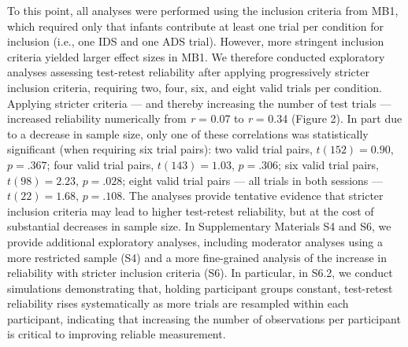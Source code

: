 \documentclass[
  man,floatsintext]{apa6}
\begin{document}
To this point, all analyses were performed using the inclusion criteria from MB1, which required only that infants contribute at least one trial per condition for inclusion (i.e., one IDS and one ADS trial).
However, more stringent inclusion criteria yielded larger effect sizes in MB1.
We therefore conducted exploratory analyses assessing test-retest reliability after applying progressively stricter inclusion criteria, requiring two, four, six, and eight valid trials per condition.
Applying stricter criteria --- and thereby increasing the number of test trials --- increased reliability numerically from \emph{r} = 0.07 to \emph{r} = 0.34 (Figure 2).
In part due to a decrease in sample size, only one of these correlations was statistically significant (when requiring six trial pairs): two valid trial pairs, \(t(152) = 0.90\), \(p = .367\); four valid trial pairs, \(t(143) = 1.03\), \(p = .306\); six valid trial pairs, \(t(98) = 2.23\), \(p = .028\); eight valid trial pairs --- all trials in both sessions --- \(t(22) = 1.68\), \(p = .108\).
The analyses provide tentative evidence that stricter inclusion criteria may lead to higher test-retest reliability, but at the cost of substantial decreases in sample size.
In Supplementary Materials S4 and S6, we provide additional exploratory analyses, including moderator analyses using a more restricted sample (S4) and a more fine-grained analysis of the increase in reliability with stricter inclusion criteria (S6).
In particular, in S6.2, we conduct simulations demonstrating that, holding participant groups constant, test-retest reliability rises systematically as more trials are resampled within each participant, indicating that increasing the number of observations per participant is critical to improving reliable measurement.
\end{document}
